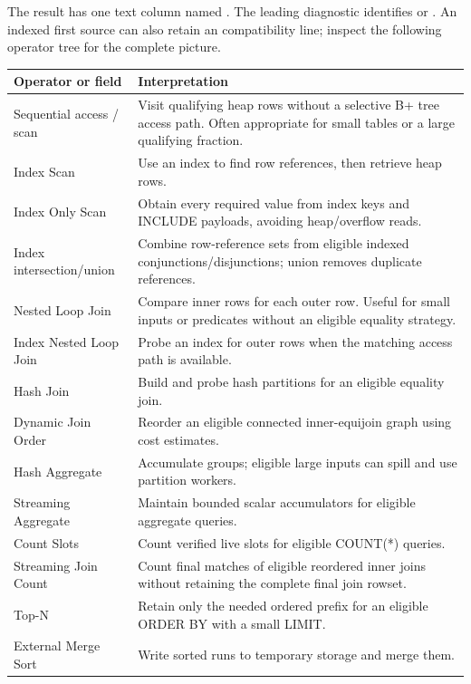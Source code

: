 The result has one text column named . The leading diagnostic identifies  or . An indexed first source can also retain an  compatibility line; inspect the following operator tree for the complete picture.

\begin{longtable}{p{.3\linewidth}p{.61\linewidth}}
\toprule Operator or field & Interpretation \\\midrule
Sequential access / scan & Visit qualifying heap rows without a selective B+ tree access path. Often appropriate for small tables or a large qualifying fraction. \\
Index Scan & Use an index to find row references, then retrieve heap rows. \\
Index Only Scan & Obtain every required value from index keys and INCLUDE payloads, avoiding heap/overflow reads. \\
Index intersection/union & Combine row-reference sets from eligible indexed conjunctions/disjunctions; union removes duplicate references. \\
Nested Loop Join & Compare inner rows for each outer row. Useful for small inputs or predicates without an eligible equality strategy. \\
Index Nested Loop Join & Probe an index for outer rows when the matching access path is available. \\
Hash Join & Build and probe hash partitions for an eligible equality join. \\
Dynamic Join Order & Reorder an eligible connected inner-equijoin graph using cost estimates. \\
Hash Aggregate & Accumulate groups; eligible large inputs can spill and use partition workers. \\
Streaming Aggregate & Maintain bounded scalar accumulators for eligible aggregate queries. \\
Count Slots & Count verified live slots for eligible COUNT(*) queries. \\
Streaming Join Count & Count final matches of eligible reordered inner joins without retaining the complete final join rowset. \\
Top-N & Retain only the needed ordered prefix for an eligible ORDER BY with a small LIMIT. \\
External Merge Sort & Write sorted runs to temporary storage and merge them. \\
\bottomrule
\end{longtable}

